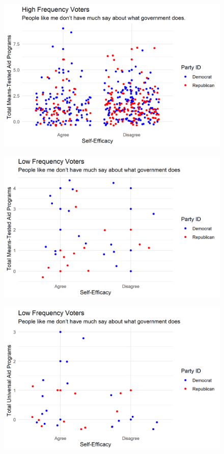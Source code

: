 \documentclass[12pt]{paper}
\begin{document}
\begin{figure}[H]
	\includegraphics[scale=0.7]{Figs/scatter_means_efficacy_high.png} \centering
	\caption{}
	\label{}
\end{figure}


\begin{figure}[H]
	\includegraphics[scale=0.7]{Figs/scatter_means_efficacy_low.png} \centering
	\caption{}
	\label{}
\end{figure}

\begin{figure}[H]
	\includegraphics[scale=0.7]{Figs/scatter_uni_efficacy_low.png} \centering
	\caption{}
	\label{}
\end{figure}
\end{document}
